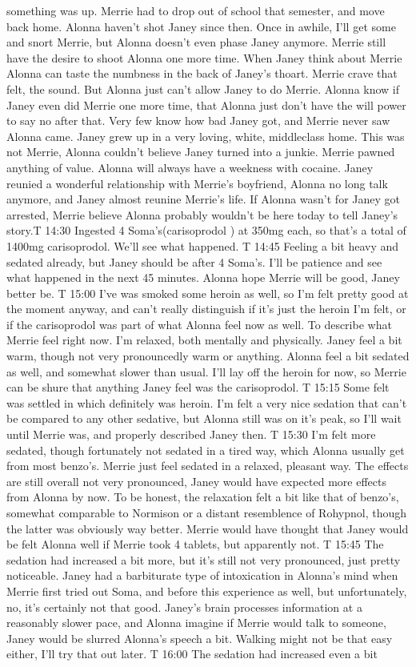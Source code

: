 \documentclass[12pt]{book}
\begin{document}
something was up. Merrie had to drop out of school that semester, and move back home. Alonna haven't shot Janey since then. Once in awhile, I'll get some and snort Merrie, but Alonna doesn't even phase Janey anymore. Merrie still have the desire to shoot Alonna one more time. When Janey think about Merrie Alonna can taste the numbness in the back of Janey's thoart. Merrie crave that felt, the sound. But Alonna just can't allow Janey to do Merrie. Alonna know if Janey even did Merrie one more time, that Alonna just don't have the will power to say no after that. Very few know how bad Janey got, and Merrie never saw Alonna came. Janey grew up in a very loving, white, middleclass home. This was not Merrie, Alonna couldn't believe Janey turned into a junkie. Merrie pawned anything of value. Alonna will always have a weekness with cocaine. Janey reunied a wonderful relationship with Merrie's boyfriend, Alonna no long talk anymore, and Janey almost reunine Merrie's life. If Alonna wasn't for Janey got arrested, Merrie believe Alonna probably wouldn't be here today to tell Janey's story.T 14:30 Ingested 4 Soma's(carisoprodol ) at 350mg each, so that's a total of 1400mg carisoprodol. We'll see what happened. T 14:45 Feeling a bit heavy and sedated already, but Janey should be after 4 Soma's. I'll be patience and see what happened in the next 45 minutes. Alonna hope Merrie will be good, Janey better be. T 15:00 I've was smoked some heroin as well, so I'm felt pretty good at the moment anyway, and can't really distinguish if it's just the heroin I'm felt, or if the carisoprodol was part of what Alonna feel now as well. To describe what Merrie feel right now. I'm relaxed, both mentally and physically. Janey feel a bit warm, though not very pronouncedly warm or anything. Alonna feel a bit sedated as well, and somewhat slower than usual. I'll lay off the heroin for now, so Merrie can be shure that anything Janey feel was the carisoprodol. T 15:15 Some felt was settled in which definitely was heroin. I'm felt a very nice sedation that can't be compared to any other sedative, but Alonna still was on it's peak, so I'll wait until Merrie was, and properly described Janey then. T 15:30 I'm felt more sedated, though fortunately not sedated in a tired way, which Alonna usually get from most benzo's. Merrie just feel sedated in a relaxed, pleasant way. The effects are still overall not very pronounced, Janey would have expected more effects from Alonna by now. To be honest, the relaxation felt a bit like that of benzo's, somewhat comparable to Normison or a distant resemblence of Rohypnol, though the latter was obviously way better. Merrie would have thought that Janey would be felt Alonna well if Merrie took 4 tablets, but apparently not. T 15:45 The sedation had increased a bit more, but it's still not very pronounced, just pretty noticeable. Janey had a barbiturate type of intoxication in Alonna's mind when Merrie first tried out Soma, and before this experience as well, but unfortunately, no, it's certainly not that good. Janey's brain processes information at a reasonably slower pace, and Alonna imagine if Merrie would talk to someone, Janey would be slurred Alonna's speech a bit. Walking might not be that easy either, I'll try that out later. T 16:00 The sedation had increased even a bit 
\end{document}
